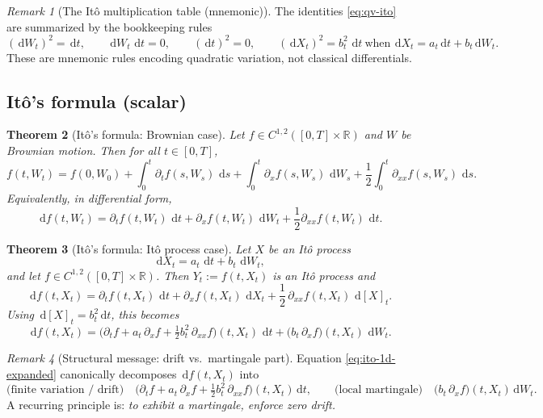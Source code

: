 \documentclass[11pt]{article}
\newcommand{\R}{\mathbb{R}}
\newcommand{\dd}{\,\mathrm{d}}
\newcommand{\1}{\mathbf{1}}
\theoremstyle{plain}
\newtheorem{theorem}{Theorem}[section]
\theoremstyle{definition}
\theoremstyle{remark}
\newtheorem{remark}[theorem]{Remark}
\begin{document}
\begin{remark}[The It\^o multiplication table (mnemonic)]
The identities \eqref{eq:qv-ito} are summarized by the bookkeeping rules
\[
(\dd W_t)^2=\dd t,
\qquad
\dd W_t\,\dd t = 0,
\qquad
(\dd t)^2=0,
\qquad
(\dd X_t)^2 = b_t^2\,\dd t
\ \text{when}\ \dd X_t=a_t\dd t+b_t\dd W_t.
\]
These are mnemonic rules encoding quadratic variation, not classical differentials.
\end{remark}

\subsection{It\^o's formula (scalar)}

\begin{theorem}[It\^o's formula: Brownian case]\label{thm:ito-bm}
Let $f\in C^{1,2}([0,T]\times\R)$ and $W$ be Brownian motion. Then for all $t\in[0,T]$,
\begin{equation}\label{eq:ito-bm}
f(t,W_t)
=
f(0,W_0)
+
\int_0^t \partial_t f(s,W_s)\,\dd s
+
\int_0^t \partial_x f(s,W_s)\,\dd W_s
+
\frac12\int_0^t \partial_{xx} f(s,W_s)\,\dd s.
\end{equation}
Equivalently, in differential form,
\[
\dd f(t,W_t)=\partial_t f(t,W_t)\,\dd t+\partial_x f(t,W_t)\,\dd W_t+\frac12\partial_{xx} f(t,W_t)\,\dd t.
\]
\end{theorem}

\begin{theorem}[It\^o's formula: It\^o process case]\label{thm:ito-1d}
Let $X$ be an It\^o process
\[
\dd X_t=a_t\,\dd t+b_t\,\dd W_t,
\]
and let $f\in C^{1,2}([0,T]\times\R)$. Then $Y_t:=f(t,X_t)$ is an It\^o process and
\begin{equation}\label{eq:ito-1d}
\dd f(t,X_t)
=
\partial_t f(t,X_t)\,\dd t
+
\partial_x f(t,X_t)\,\dd X_t
+
\frac12\,\partial_{xx} f(t,X_t)\,\dd[X]_t.
\end{equation}
Using $\dd[X]_t=b_t^2\dd t$, this becomes
\begin{equation}\label{eq:ito-1d-expanded}
\dd f(t,X_t)
=
\Big(\partial_t f + a_t\,\partial_x f + \tfrac12 b_t^2\,\partial_{xx} f\Big)(t,X_t)\,\dd t
+
\big(b_t\,\partial_x f\big)(t,X_t)\,\dd W_t.
\end{equation}
\end{theorem}

\begin{remark}[Structural message: drift vs.\ martingale part]
Equation \eqref{eq:ito-1d-expanded} canonically decomposes $\dd f(t,X_t)$ into
\[
\text{(finite variation / drift)}\quad
\Big(\partial_t f + a_t\,\partial_x f + \tfrac12 b_t^2\,\partial_{xx} f\Big)(t,X_t)\dd t,
\qquad
\text{(local martingale)}\quad
\big(b_t\,\partial_x f\big)(t,X_t)\dd W_t.
\]
A recurring principle is: \emph{to exhibit a martingale, enforce zero drift.}
\end{remark}
\end{document}

